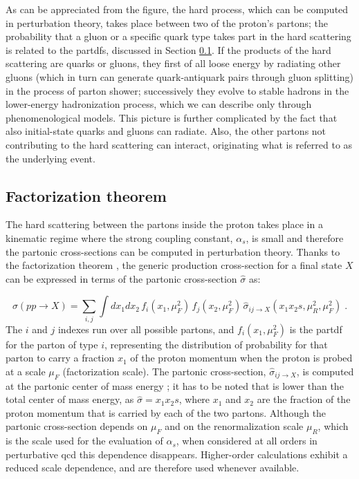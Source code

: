 As can be appreciated from the figure, the hard process, which can be computed in perturbation theory, takes place between two of the proton's partons; the probability that a gluon or a specific quark type takes part in the hard scattering is related to the \glspl{partdf}, discussed in Section \ref{sec:ppint:hardscatter}. If the products of the hard scattering are quarks or gluons, they first of all loose energy by radiating other gluons (which in turn can generate quark-antiquark pairs through gluon splitting) in the process of parton shower;
successively they evolve to stable hadrons in the lower-energy hadronization process, which we can describe only through phenomenological models.
This picture is further complicated by the fact that also initial-state quarks and gluons can radiate. Also, the other partons not contributing to the hard scattering can interact, originating what is referred to as the underlying event. 

\subsection{Factorization theorem}
\label{sec:ppint:hardscatter}

The hard scattering between the partons inside the proton takes place in a kinematic regime where the strong coupling constant, $\alpha_s$, 
is small and therefore the partonic cross-sections can be computed in perturbation theory. 
Thanks to the factorization theorem \cite{doi:10.1146}, the generic production cross-section for a final state $X$ can be expressed in terms of the partonic cross-section $\hat\sigma$ as:

\begin{equation}
  \sigma(pp\rightarrow X) = \sum_{i,j} \int dx_1 dx_2\, 
     f_{i}(x_1,\mu_F^2)\, f_{j}(x_2,\mu_F^2)\, 
     \hat\sigma_{ij\rightarrow X}(x_1 x_2 s, \mu_R^2, \mu_F^2) \; .
  \label{eq:general-cross-section}
\end{equation}
The $i$ and $j$ indexes run over all possible partons, and $f_{i}(x_1,\mu_F^2)$ is the \gls{partdf} for the parton of type $i$, representing 
the distribution of probability for that parton to carry a fraction $x_1$ of the proton momentum when the proton is probed at a scale $\mu_F$
(factorization scale). The partonic cross-section, $\hat\sigma_{ij\rightarrow X}$, is computed at the partonic center of mass energy \cmpart;   
it has to be noted that \cmpart is lower than the total center of mass energy, as 
$\hat\sigma = x_1  x_2  s$, 
where $x_1$ and $x_2$ are the fraction of the proton momentum that is carried by each of the two partons.
Although the partonic cross-section depends on $\mu_F$ and on the renormalization scale $\mu_R$, 
which is the scale used for the evaluation of $\alpha_s$, 
when considered at all orders in perturbative \gls{qcd} this dependence disappears.
Higher-order calculations exhibit a reduced scale dependence, and are therefore used whenever available. 


